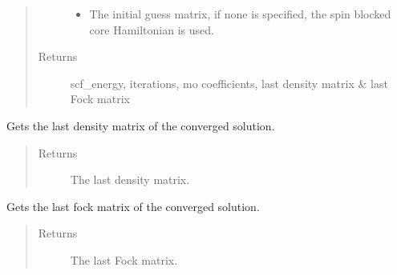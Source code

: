 \documentclass[letterpaper,10pt,english]{sphinxmanual}
\begin{document}
\begin{fulllineitems}
\begin{fulllineitems}
\begin{quote}
\begin{description}
\begin{itemize}
\item {} 
 \textendash{} The initial guess matrix, if none is specified, the spin blocked core Hamiltonian is used.

\end{itemize}

\item[{Returns}] \leavevmode
scf\_energy, iterations, mo coefficients, last density matrix \& last Fock matrix

\end{description}\end{quote}

\end{fulllineitems}


\begin{fulllineitems}
\label{\detokenize{Real_GHF:ghf.real_GHF.RealGHF.get_last_dens}}
Gets the last density matrix of the converged solution.
\begin{quote}\begin{description}
\item[{Returns}] \leavevmode
The last density matrix.

\end{description}\end{quote}

\end{fulllineitems}


\begin{fulllineitems}
\label{\detokenize{Real_GHF:ghf.real_GHF.RealGHF.get_last_fock}}
Gets the last fock matrix of the converged solution.
\begin{quote}\begin{description}
\item[{Returns}] \leavevmode
The last Fock matrix.

\end{description}\end{quote}

\end{fulllineitems}


\end{fulllineitems}
\end{document}
